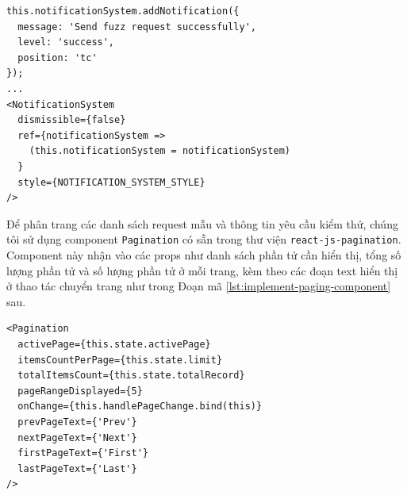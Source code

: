 \begin{lstlisting}[style=ES6, label={lst:implement-notifications}, caption={Các thuộc tính props truyền vào component NotificationSystem}]
this.notificationSystem.addNotification({
  message: 'Send fuzz request successfully',
  level: 'success',
  position: 'tc'
});
...
<NotificationSystem
  dismissible={false}
  ref={notificationSystem =>
    (this.notificationSystem = notificationSystem)
  }
  style={NOTIFICATION_SYSTEM_STYLE}
/>
\end{lstlisting}
Để phân trang các danh sách request mẫu và thông tin yêu cầu kiểm thử, chúng tôi sử dụng component \texttt{Pagination} có sẵn trong thư viện \texttt{react-js-pagination}. Component này nhận vào các props như danh sách phần tử cần hiển thị, tổng số lượng phần tử và số lượng phần tử ở mỗi trang, kèm theo các đoạn text hiển thị ở thao tác chuyển trang như trong Đoạn mã \ref{lst:implement-paging-component} sau.
\begin{lstlisting}[style=ES6, label={lst:implement-paging-component}, caption={Các thuộc tính props truyền vào component Pagination}]
<Pagination
  activePage={this.state.activePage}
  itemsCountPerPage={this.state.limit}
  totalItemsCount={this.state.totalRecord}
  pageRangeDisplayed={5}
  onChange={this.handlePageChange.bind(this)}
  prevPageText={'Prev'}
  nextPageText={'Next'}
  firstPageText={'First'}
  lastPageText={'Last'}
/>
\end{lstlisting}

